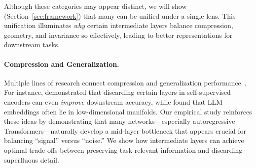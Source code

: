 

Although these categories may appear distinct, we will show (Section~\ref{sec:framework}) that many can be unified under a single lens. This unification illuminates \emph{why} certain intermediate layers balance compression, geometry, and invariance so effectively, leading to better representations for downstream tasks.

\paragraph{Compression and Generalization.}

Multiple lines of research connect compression and generalization performance~\cite{deletanglanguage}. For instance, \citet{bordes2022guillotine} demonstrated that discarding certain layers in self-supervised encoders can even \emph{improve} downstream accuracy, while \citet{park2024geometry} found that LLM embeddings often lie in low-dimensional manifolds. Our empirical study reinforces these ideas by demonstrating that many networks—especially autoregressive Transformers—naturally develop a mid-layer bottleneck that appears crucial for balancing “signal” versus “noise.” We show how intermediate layers can achieve optimal trade-offs between preserving task-relevant information and discarding superfluous detail.




